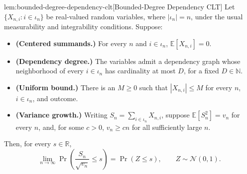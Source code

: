 \documentclass[11pt]{article}
\begin{document}
\begin{lemmav}{lem:bounded-degree-dependency-clt}[Bounded-Degree Dependency CLT]
Let \(\{X_{n,i}: i\in\iota_n\}\) be real-valued random variables, where \(|\iota_n|=n\), under the usual measurability and integrability conditions. Suppose:
\begin{itemize}
\item \textbf{(Centered summands.)} For every \(n\) and \(i\in\iota_n\), \(\mathbb E[X_{n,i}]=0\).
\item \textbf{(Dependency degree.)} The variables admit a dependency graph whose neighborhood of every \(i\in\iota_n\) has cardinality at most \(D\), for a fixed \(D\in\mathbb N\).
\item \textbf{(Uniform bound.)} There is an \(M\ge 0\) such that \(|X_{n,i}|\le M\) for every \(n\), \(i\in\iota_n\), and outcome.
\item \textbf{(Variance growth.)} Writing \(S_n=\sum_{i\in\iota_n}X_{n,i}\), suppose \(\mathbb E[S_n^2]=v_n\) for every \(n\), and, for some \(c>0\), \(v_n\ge cn\) for all sufficiently large \(n\).
\end{itemize}
Then, for every \(s\in\mathbb R\),
\[
\lim_{n\to\infty}\Pr\!\left(\frac{S_n}{\sqrt{v_n}}\le s\right)
=
\Pr\!\left(Z\le s\right),
\qquad Z\sim\mathcal N(0,1).
\]
\end{lemmav}
\end{document}
